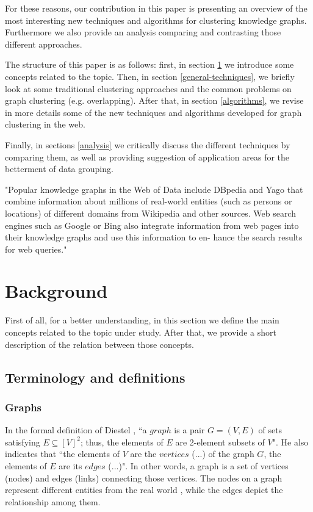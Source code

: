 \documentclass[runningheads]{llncs}
\begin{document}
For these reasons, our contribution in this paper is presenting an overview of the most interesting new techniques and algorithms for clustering knowledge graphs. Furthermore we also provide an analysis comparing and contrasting those different approaches.

The structure of this paper is as follows: first, in section \ref{background} we introduce some concepts related to the topic. Then, in section \ref{general-techniques}, we briefly look at some traditional clustering approaches and the common problems on graph clustering (e.g. overlapping). After that, in section \ref{algorithms}, we revise in more details some of the new techniques and algorithms developed for graph clustering in the web.

Finally, in sections \ref{analysis} we critically discuss the different techniques by comparing them, as well as providing suggestion of application areas for the betterment of data grouping. 


"Popular knowledge graphs in the Web of Data include DBpedia and Yago that combine information about millions of real-world entities (such as persons or locations) of different domains from Wikipedia and other sources. Web search engines such as Google or Bing also integrate information from web pages into their knowledge graphs and use this information to en- hance the search results for web queries." \cite{Saeedi}

\section{Background} \label{background}
First of all, for a better understanding, in this section we define the main concepts related to the topic under study. After that, we provide a short description of the relation between those concepts.

\subsection{Terminology and definitions} \label{terminology}

\subsubsection{Graphs} \label{graphs}
In the formal definition of Diestel \cite{Diestel}, ``a $graph$ is a pair $G = (V, E)$ of sets satisfying $E \subseteq [V]^2$; thus, the elements of $E$ are 2-element subsets of $V$". He also indicates that ``the elements of $V$ are the $vertices$ (...) of the graph $G$, the elements of $E$ are its $edges$ (...)". In other words, a graph is a set of vertices (nodes) and edges (links) connecting those vertices. The nodes on a graph represent different entities from the real world \cite{Robinson}, while the edges depict the relationship among them.
\end{document}
